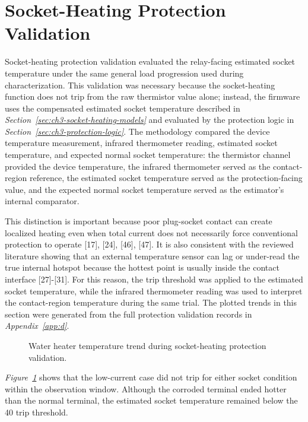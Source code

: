 \section{Socket-Heating Protection Validation}
\label{sec:ch4-socket-heating-protection}

Socket-heating protection validation evaluated the relay-facing estimated
socket temperature under the same general load progression used during
characterization. This validation was necessary because the socket-heating
function does not trip from the raw thermistor value alone; instead, the
firmware uses the compensated estimated socket temperature described in
\textit{Section~\ref{sec:ch3-socket-heating-models}} and evaluated by the
protection logic in \textit{Section~\ref{sec:ch3-protection-logic}}. The
methodology compared the device temperature measurement, infrared thermometer
reading, estimated socket temperature, and expected normal socket temperature:
the thermistor channel provided the device temperature, the infrared thermometer
served as the contact-region reference, the estimated socket temperature served
as the protection-facing value, and the expected normal socket temperature
served as the estimator's internal comparator.

This distinction is important because poor plug-socket contact can create
localized heating even when total current does not necessarily force
conventional protection to operate [17], [24], [46], [47]. It is also consistent
with the reviewed literature showing that an external temperature sensor can lag
or under-read the true internal hotspot because the hottest point is usually
inside the contact interface [27]-[31]. For this reason, the trip threshold was
applied to the estimated socket temperature, while the infrared thermometer
reading was used to interpret the contact-region temperature during the same
trial. The plotted trends in this section were generated from the full
protection validation records in \textit{Appendix~\ref{app:d}}.

\begin{figure}[H]
  \centering
  \caption{Water heater temperature trend during socket-heating protection validation.}
  \label{fig:ch4-protect-water-heater}
\end{figure}

\textit{Figure~\ref{fig:ch4-protect-water-heater}} shows that the low-current
case did not trip for either socket condition within the observation window.
Although the corroded terminal ended hotter than the normal terminal, the
estimated socket temperature remained below the 40{\degreeC} trip threshold.

